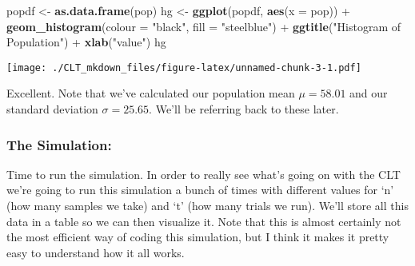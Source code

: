 \documentclass[]{article}
\newenvironment{Shaded}{\begin{snugshade}}{\end{snugshade}}
\newcommand{\KeywordTok}[1]{\textcolor[rgb]{0.13,0.29,0.53}{\textbf{{#1}}}}
\newcommand{\DataTypeTok}[1]{\textcolor[rgb]{0.13,0.29,0.53}{{#1}}}
\newcommand{\StringTok}[1]{\textcolor[rgb]{0.31,0.60,0.02}{{#1}}}
\newcommand{\NormalTok}[1]{{#1}}
\begin{document}
\begin{Shaded}
\begin{Highlighting}[]
\NormalTok{popdf <-}\StringTok{ }\KeywordTok{as.data.frame}\NormalTok{(pop)}
\NormalTok{hg <-}\StringTok{ }\KeywordTok{ggplot}\NormalTok{(popdf, }\KeywordTok{aes}\NormalTok{(}\DataTypeTok{x =} \NormalTok{pop)) +}\StringTok{ }\KeywordTok{geom_histogram}\NormalTok{(}\DataTypeTok{colour =} \StringTok{"black"}\NormalTok{, }\DataTypeTok{fill =} \StringTok{"steelblue"}\NormalTok{) +}\StringTok{ }
\StringTok{        }\KeywordTok{ggtitle}\NormalTok{(}\StringTok{"Histogram of Population"}\NormalTok{) +}\StringTok{ }\KeywordTok{xlab}\NormalTok{(}\StringTok{"value"}\NormalTok{)}
\NormalTok{hg}
\end{Highlighting}
\end{Shaded}

\texttt{[image: ./CLT\_mkdown\_files/figure-latex/unnamed-chunk-3-1.pdf]}

Excellent. Note that we've calculated our population mean $\mu = 58.01$
and our standard deviation $\sigma = 25.65$. We'll be referring back to
these later.

\subsubsection{The Simulation:}\label{the-simulation}

Time to run the simulation. In order to really see what's going on with
the CLT we're going to run this simulation a bunch of times with
different values for `n' (how many samples we take) and `t' (how many
trials we run). We'll store all this data in a table so we can then
visualize it. Note that this is almost certainly not the most efficient
way of coding this simulation, but I think it makes it pretty easy to
understand how it all works.
\end{document}
